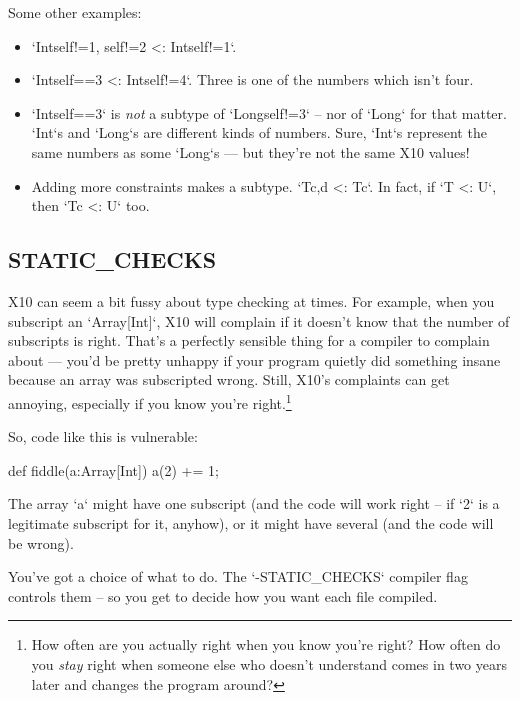 Some other examples: 

\begin{itemize}

\item \xcd`Int{self!=1, self!=2} <: Int{self!=1}`. 

\item \xcd`Int{self==3} <: Int{self!=4}`.  Three is one of the numbers which
      isn't four.

\item \xcd`Int{self==3}` is {\em not} a subtype of \xcd`Long{self!=3}` -- nor
      of \xcd`Long` for that matter.  \xcd`Int`s and \xcd`Long`s are different
      kinds of numbers.  Sure, \xcd`Int`s represent the same numbers as some 
      \xcd`Long`s --- but they're not the same X10 values!  

\item Adding more constraints makes a subtype.  \xcd`T{c,d} <: T{c}`.  In
      fact, if \xcd`T <: U`, then \xcd`T{c} <: U` too. 

\end{itemize}

\subsection{STATIC\_CHECKS}

X10 can seem a bit fussy about type checking at times.  For example, when you
subscript an \xcd`Array[Int]`, X10 will complain if it doesn't know that the
number of subscripts is right.  That's a perfectly sensible thing for a
compiler to complain about --- you'd be pretty unhappy if your program quietly
did something insane because an array was subscripted wrong.  Still, X10's
complaints can get annoying, especially if you know you're
right.\footnote{How often are you actually right when you know you're right?
How often do you {\em stay} right when someone else who doesn't understand
comes in two years later and changes the program around?}

So, code like this is vulnerable: 
\begin{xtennum}[]
def fiddle(a:Array[Int]) {
  a(2) += 1;
}
\end{xtennum}
The array \xcd`a` might have one subscript (and the code will work right -- if
\xcd`2` is a legitimate subscript for it, anyhow), or it might have several
(and the code will be wrong).  

You've got a choice of what to do. The \xcd`-STATIC_CHECKS` compiler flag
controls them -- so you get to decide how you want each file compiled.


